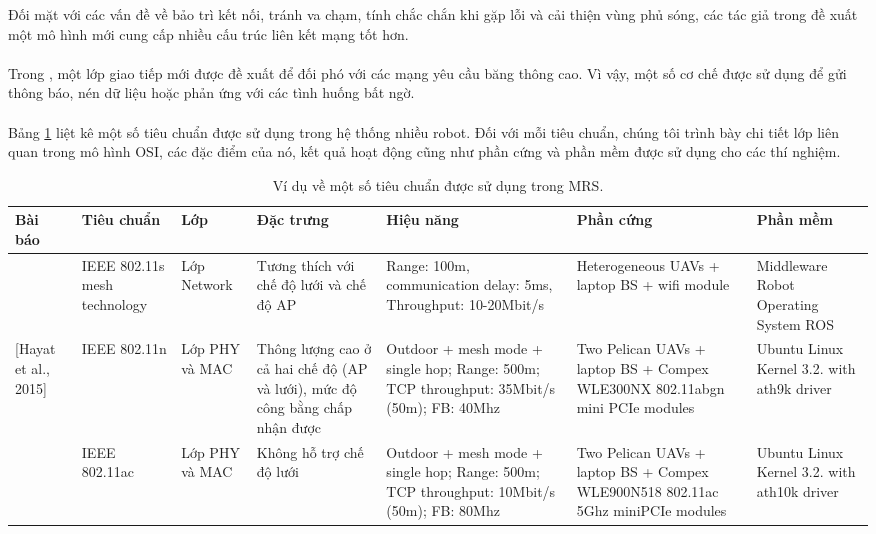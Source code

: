\documentclass[11pt,openany]{book}
\begin{document}
Đối mặt với các vấn đề về bảo trì kết nối, tránh va chạm, tính chắc chắn khi gặp lỗi và cải thiện vùng phủ sóng, các tác giả trong \cite{ghedini2018toward} đề xuất một mô hình mới cung cấp nhiều cấu trúc liên kết mạng tốt hơn.\\\\
Trong \cite{harms2017development}, một lớp giao tiếp mới được đề xuất để đối phó với các mạng yêu cầu băng thông cao. Vì vậy, một số cơ chế được sử dụng để gửi thông báo, nén dữ liệu hoặc phản ứng với các tình huống bất ngờ.\\\\
Bảng \ref{tab:4.3} liệt kê một số tiêu chuẩn được sử dụng trong hệ thống nhiều robot. Đối với mỗi tiêu chuẩn, chúng tôi trình bày chi tiết lớp liên quan trong mô hình OSI, các đặc điểm của nó, kết quả hoạt động cũng như phần cứng và phần mềm được sử dụng cho các thí nghiệm.
\begin{landscape}
    \begin{table}[H]
        \centering
        \caption{Ví dụ về một số tiêu chuẩn được sử dụng trong MRS.}
        \label{tab:4.3}
        \begin{tabular}{|p{1.5cm}|p{1.7cm}|p{1.3cm}|p{2.9cm}|p{2.7cm}|p{2.3cm}|p{2cm}|}\hline
            \textbf{Bài báo}                          & \textbf{Tiêu chuẩn}          & \textbf{Lớp}   & \textbf{Đặc trưng}                                                            & \textbf{Hiệu năng}                                                                       & \textbf{Phần cứng}                                                              & \textbf{Phần mềm}
            \\\hline
            [Scherer et al., 2015]                    & IEEE 802.11s mesh technology & Lớp Network    & Tương thích với chế độ lưới và chế độ AP                                      & Range: 100m, communication delay: 5ms, Throughput: 10-20Mbit/s                           & Heterogeneous UAVs + laptop BS + wifi module                                    & Middleware Robot Operating System ROS       \\\hline
            \multirow{2}{1.5cm}{[Hayat et al., 2015]} & IEEE 802.11n                 & Lớp PHY và MAC & Thông lượng cao ở cả hai chế độ (AP và lưới), mức độ công bằng chấp nhận được & Outdoor + mesh mode + single hop; Range: 500m; TCP throughput: 35Mbit/s (50m); FB: 40Mhz & Two Pelican UAVs + laptop BS + Compex WLE300NX 802.11abgn mini PCIe modules     & Ubuntu Linux Kernel 3.2. with ath9k driver  \\\cline{2-7}
                                                      & IEEE 802.11ac                & Lớp PHY và MAC & Không hỗ trợ chế độ lưới                                                      & Outdoor + mesh mode + single hop; Range: 500m; TCP throughput: 10Mbit/s (50m); FB: 80Mhz & Two Pelican UAVs + laptop BS + Compex WLE900N518 802.11ac 5Ghz miniPCIe modules & Ubuntu Linux Kernel 3.2. with ath10k driver \\\hline
        \end{tabular}
    \end{table}
\end{landscape}
\end{document}
